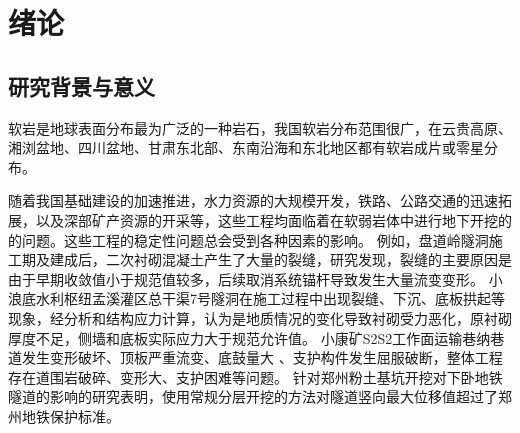 \chapter{绪论}
\label{chap:introduction}

\section{研究背景与意义}
软岩是地球表面分布最为广泛的一种岩石，我国软岩分布范围很广，在云贵高原、湘浏盆地、四川盆地、甘肃东北部、东南沿海和东北地区都有软岩成片或零星分布\cite{黄志全2021}。



随着我国基础建设的加速推进，水力资源的大规模开发，铁路、公路交通的迅速拓展，以及深部矿产资源的开采等，这些工程均面临着在软弱岩体中进行地下开挖的的问题。这些工程的稳定性问题总会受到各种因素的影响。
例如，盘道岭隧洞施工期及建成后，二次衬砌混凝土产生了大量的裂缝，研究发现，裂缝的主要原因是由于早期收敛值小于规范值较多，后续取消系统锚杆导致发生大量流变变形\cite{陈晓东1996}。
小浪底水利枢纽孟溪灌区总干渠7号隧洞在施工过程中出现裂缝、下沉、底板拱起等现象，经分析和结构应力计算，认为是地质情况的变化导致衬砌受力恶化，原衬砌厚度不足，侧墙和底板实际应力大于规范允许值\cite{黄晓林2008}。
小康矿S2S2工作面运输巷纳巷道发生变形破坏、顶板严重流变、底鼓量大 、支护构件发生屈服破断，整体工程存在道围岩破碎、变形大、支护困难等问题\cite{王国强2018}。
针对郑州粉土基坑开挖对下卧地铁隧道的影响的研究表明，使用常规分层开挖的方法对隧道竖向最大位移值超过了郑州地铁保护标准\cite{郭院成2019}。

